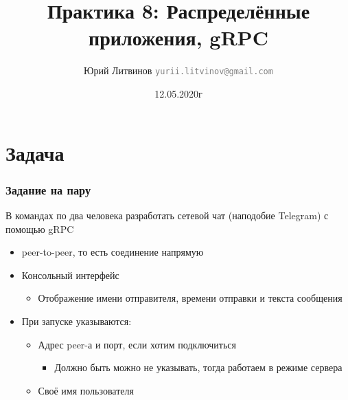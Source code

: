 \documentclass[xetex,mathserif,serif]{beamer}
\title{Практика 8: Распределённые приложения, gRPC}
\author[Юрий Литвинов]{Юрий Литвинов \newline \textcolor{gray}{\small\texttt{yurii.litvinov@gmail.com}}}
\date{12.05.2020г}
\begin{document}
	
	\frame{\titlepage}

	\section{Задача}

	\begin{frame}
		\frametitle{Задание на пару}
		В командах по два человека разработать сетевой чат (наподобие Telegram) с помощью gRPC
		\begin{itemize}
			\item peer-to-peer, то есть соединение напрямую
			\item Консольный интерфейс
			\begin{itemize}
				\item Отображение имени отправителя, времени отправки и текста сообщения
			\end{itemize}
			\item При запуске указываются:
			\begin{itemize}
				\item Адрес peer-а и порт, если хотим подключиться
				\begin{itemize}
					\item Должно быть можно не указывать, тогда работаем в режиме сервера
				\end{itemize}
				\item Своё имя пользователя
			\end{itemize}
		\end{itemize}
	\end{frame}
\end{document}
